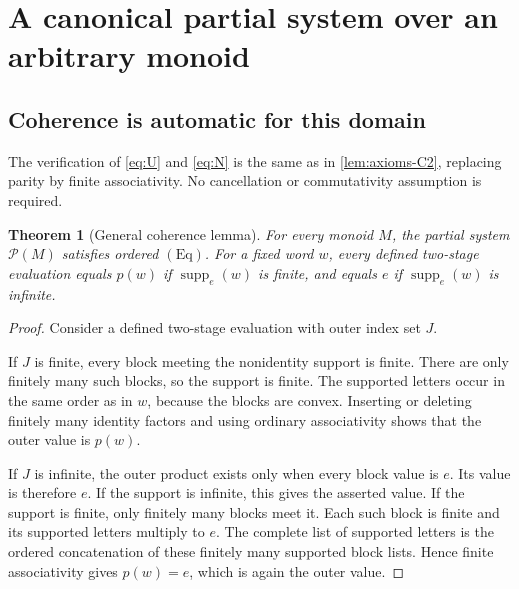 \documentclass[11pt,letterpaper]{article}
\numberwithin{equation}{section}
\newtheorem{theorem}{Theorem}[section]
\theoremstyle{definition}
\newtheorem{definition}[theorem]{Definition}
\theoremstyle{remark}
\newcommand{\PP}{\mathcal{P}}
\newcommand{\supp}{\operatorname{supp}}
\newcommand{\Eq}{\mathrm{Eq}}
\newcommand{\undefinedprod}{\text{undefined}}
\begin{document}
\section{A canonical partial system over an arbitrary monoid}
\label{sec:monoids}
\subsection{Coherence is automatic for this domain}

The verification of \eqref{eq:U} and \eqref{eq:N} is the same as in \cref{lem:axioms-C2}, replacing parity by finite associativity. No cancellation or commutativity assumption is required.

\begin{theorem}[General coherence lemma]\label{thm:monoid-Eq}
For every monoid $M$, the partial system $\PP(M)$ satisfies ordered $(\Eq)$. For a fixed word $w$, every defined two-stage evaluation equals $p(w)$ if $\supp_e(w)$ is finite, and equals $e$ if $\supp_e(w)$ is infinite.
\end{theorem}
\begin{proof}
Consider a defined two-stage evaluation with outer index set $J$.

If $J$ is finite, every block meeting the nonidentity support is finite. There are only finitely many such blocks, so the support is finite. The supported letters occur in the same order as in $w$, because the blocks are convex. Inserting or deleting finitely many identity factors and using ordinary associativity shows that the outer value is $p(w)$.

If $J$ is infinite, the outer product exists only when every block value is $e$. Its value is therefore $e$. If the support is infinite, this gives the asserted value. If the support is finite, only finitely many blocks meet it. Each such block is finite and its supported letters multiply to $e$. The complete list of supported letters is the ordered concatenation of these finitely many supported block lists. Hence finite associativity gives $p(w)=e$, which is again the outer value.
\end{proof}
\end{document}
